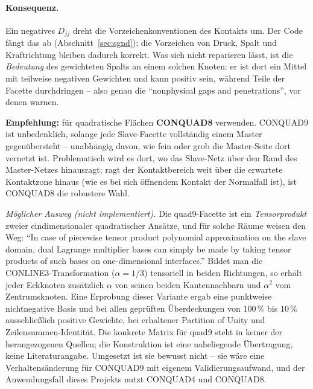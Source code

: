 \documentclass[a4paper,11pt]{article}
\def\tfrac#1#2{#1/#2}%
\def\tilde#1{#1}%
\begin{document}
\paragraph{Konsequenz.} Ein negatives $\tilde D_{jj}$ dreht die Vorzeichenkonventionen des
Kontakts um. Der Code fängt das ab (Abschnitt~\ref{sec:sgnd}); die Vorzeichen von Druck, Spalt und
Kraftrichtung bleiben dadurch korrekt. Was sich nicht reparieren lässt, ist die \emph{Bedeutung}
des gewichteten Spalts an einem solchen Knoten: er ist dort ein Mittel mit teilweise negativen
Gewichten und kann positiv sein, während Teile der Facette durchdringen -- also genau die
``nonphysical gaps and penetrations'', vor denen \citet[Abschn.~4.3]{popp2012} warnen.

\medskip
\noindent\textbf{Empfehlung:} für quadratische Flächen \textbf{CONQUAD8} verwenden. CONQUAD9 ist
unbedenklich, solange jede Slave-Facette vollständig einem Master gegenübersteht -- unabhängig
davon, wie fein oder grob die Master-Seite dort vernetzt ist. Problematisch wird es dort, wo das
Slave-Netz über den Rand des Master-Netzes hinausragt; ragt der Kontaktbereich weit über die
erwartete Kontaktzone hinaus (wie es bei sich öffnendem Kontakt der Normalfall ist), ist CONQUAD8
die robustere Wahl.

\medskip
\noindent\textit{Möglicher Ausweg (nicht implementiert).} Die quad9-Facette ist ein
\emph{Tensorprodukt} zweier eindimensionaler quadratischer Ansätze, und für solche Räume weisen
\citet[S.~109]{lamichhane2005} den Weg: ``In case of piecewise tensor product polynomial
approximation on the slave domain, dual Lagrange multiplier bases can simply be made by taking
tensor products of such bases on one-dimensional interfaces.'' Bildet man die
CONLINE3-Transformation ($\alpha=\tfrac13$) tensoriell in beiden Richtungen, so erhält jeder
Eckknoten zusätzlich $\alpha$ von seinen beiden Kantennachbarn und $\alpha^2$ vom Zentrumsknoten.
Eine Erprobung dieser Variante ergab eine punktweise nichtnegative Basis und bei allen geprüften
Überdeckungen von $100\,\%$ bis $10\,\%$ ausschließlich positive Gewichte, bei erhaltener Partition
of Unity und Zeilensummen-Identität. Die konkrete Matrix für quad9 steht in keiner der
herangezogenen Quellen; die Konstruktion ist eine naheliegende Übertragung, keine Literaturangabe.
Umgesetzt ist sie bewusst nicht -- sie wäre eine Verhaltensänderung für CONQUAD9 mit eigenem
Validierungsaufwand, und der Anwendungsfall dieses Projekts nutzt CONQUAD4 und CONQUAD8.
\end{document}
